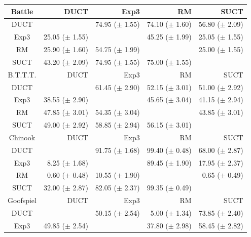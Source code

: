 \documentclass[conference]{IEEEtran}
\begin{document}
\begin{table}
\begin{center}
\begin{tabular}{|c|rrrr|}
\hline
         Battle   &       DUCT   &       Exp3   &         RM   &       SUCT   \\
\hline
           DUCT    &          & 74.95 ($\pm$ 1.55)   & 74.10 ($\pm$ 1.60)   & 56.80 ($\pm$ 2.09)   \\
           Exp3    & 25.05 ($\pm$ 1.55)   &          & 45.25 ($\pm$ 1.99)   & 25.05 ($\pm$ 1.55)   \\
             RM    & 25.90 ($\pm$ 1.60)   & 54.75 ($\pm$ 1.99)   &          & 25.00 ($\pm$ 1.55)   \\
           SUCT    & 43.20 ($\pm$ 2.09)   & 74.95 ($\pm$ 1.55)   & 75.00 ($\pm$ 1.55)   &          \\
\hline
\hline
B.T.T.T.   &       DUCT   &       Exp3   &         RM   &       SUCT   \\
\hline
           DUCT    &          & 61.45 ($\pm$ 2.90)   & 52.15 ($\pm$ 3.01)   & 51.00 ($\pm$ 2.92)   \\
           Exp3    & 38.55 ($\pm$ 2.90)   &          & 45.65 ($\pm$ 3.04)   & 41.15 ($\pm$ 2.94)   \\
             RM    & 47.85 ($\pm$ 3.01)   & 54.35 ($\pm$ 3.04)   &          & 43.85 ($\pm$ 3.01)   \\
           SUCT    & 49.00 ($\pm$ 2.92)   & 58.85 ($\pm$ 2.94)   & 56.15 ($\pm$ 3.01)   &          \\
\hline
\hline
        Chinook   &       DUCT   &       Exp3   &         RM   &       SUCT   \\
\hline
           DUCT    &          & 91.75 ($\pm$ 1.68)   & 99.40 ($\pm$ 0.48)   & 68.00 ($\pm$ 2.87)   \\
           Exp3    & 8.25 ($\pm$ 1.68)   &          & 89.45 ($\pm$ 1.90)   & 17.95 ($\pm$ 2.37)   \\
             RM    & 0.60 ($\pm$ 0.48)   & 10.55 ($\pm$ 1.90)   &          & 0.65 ($\pm$ 0.49)   \\
           SUCT    & 32.00 ($\pm$ 2.87)   & 82.05 ($\pm$ 2.37)   & 99.35 ($\pm$ 0.49)   &          \\
\hline
\hline
      Goofspiel   &       DUCT   &       Exp3   &         RM   &       SUCT   \\
\hline
           DUCT    &          & 50.15 ($\pm$ 2.54)   & 5.00 ($\pm$ 1.34)   & 73.85 ($\pm$ 2.40)   \\
           Exp3    & 49.85 ($\pm$ 2.54)   &          & 37.80 ($\pm$ 2.98)   & 58.45 ($\pm$ 2.82)   \\

\end{tabular}
\end{center}
\end{table}
\end{document}
